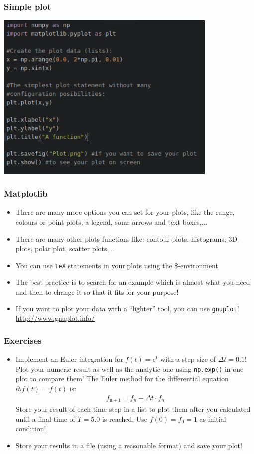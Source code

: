 \documentclass{beamer}
\begin{document}
\begin{frame}
\frametitle{Simple plot}
	\includegraphics[width = 0.8\textwidth]{SimplePlot.pdf}
\end{frame}

\begin{frame}
\frametitle{Matplotlib}
	\begin{itemize}
		\item There are many more options you can set for your plots, like the range, colours or point-plots, a legend, some arrows and text boxes,...
	 	\item There are many other plots functions like: contour-plots, histograms, 3D-plots, polar plot, scatter plots,...
	 	\item You can use \texttt{TeX} statements in your plots using the \$-environment
	 	\item The best practice is to search for an example which is almost what you need and then to change it so that it fits for your purpose!
	 	\item If you want to plot your data with a ``lighter'' tool, you can use \texttt{gnuplot}! \url{http://www.gnuplot.info/}
	\end{itemize}
\end{frame}

\begin{frame}
\frametitle{Exercises}
	\begin{itemize}
		\item Implement an Euler integration for $f(t) = e^t$ with a step size of $\Delta t = 0.1$! Plot your numeric result as well as the analytic one using \texttt{np.exp()} in one plot to compare them! The Euler method for the differential equation $\partial_t f(t) = f(t)$ is:
		\begin{align}
		f_{\mathrm{n+1}} = f_{n} + \Delta t \cdot f_{n}
		\end{align}
		Store your result of each time step in a list to plot them after you calculated until a final time of $T= 5.0$ is reached. Use $f(0) = f_0 = 1$ as initial condition!
		\item Store your results in a file (using a reasonable format) and save your plot!
		
	\end{itemize}
\end{frame}
\end{document}
